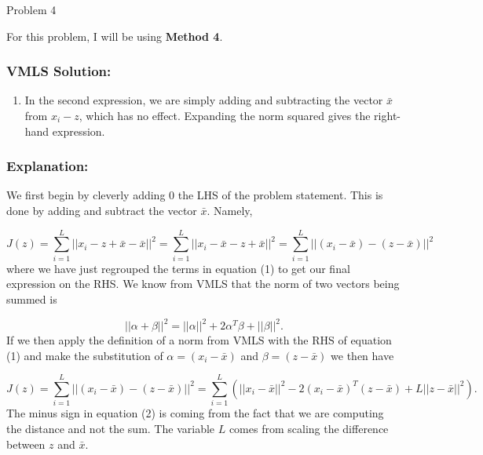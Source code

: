 \begin{problem}{Problem 4}
    \begin{Highlight}
        \noindent For this problem, I will be using \textbf{Method 4}.

        \subsubsection*{VMLS Solution:}

        \begin{enumerate}[label = (\alph*)]
            \item In the second expression, we are simply adding and subtracting the vector $\bar{x}$ from $x_{i} - z$, which has no effect. Expanding the norm squared gives the right-hand expression.
        \end{enumerate}

        \subsubsection*{Explanation:}

        We first begin by cleverly adding 0 the LHS of the problem statement. This is done by adding and subtract the vector $\bar{x}$. Namely,

        \setcounter{equation}{0}
        \begin{equation}
            J(z) = \sum^{L}_{i = 1} ||x_{i} - z + \bar{x} - \bar{x}||^{2} = \sum^{L}_{i = 1} ||x_{i} - \bar{x} - z + \bar{x}||^{2} = \sum^{L}_{i = 1} ||(x_{i} - \bar{x}) - (z - \bar{x})||^{2}
        \end{equation}
        where we have just regrouped the terms in equation (1) to get our final expression on the RHS. We know from VMLS that the norm of two vectors being summed is 

        \begin{equation*}
            ||\alpha + \beta||^{2} = ||\alpha||^{2} + 2\alpha^{T}\beta + ||\beta||^{2}.
        \end{equation*}
        If we then apply the definition of a norm from VMLS with the RHS of equation (1) and make the substitution of $\alpha = (x_{i} - \bar{x})$ and $\beta = (z - \bar{x})$ we then have

        \begin{equation}
            J(z) = \sum^{L}_{i = 1} ||(x_{i} - \bar{x}) - (z - \bar{x})||^{2} = \sum^{L}_{i = 1} (||x_{i} - \bar{x}||^{2} - 2(x_{i} - \bar{x})^{T}(z - \bar{x}) + L||z - \bar{x}||^{2}).
        \end{equation}
        The minus sign in equation (2) is coming from the fact that we are computing the distance and not the sum. The variable $L$ comes from scaling the difference between $z$ and $\bar{x}$.
    \end{Highlight}


\end{problem}
